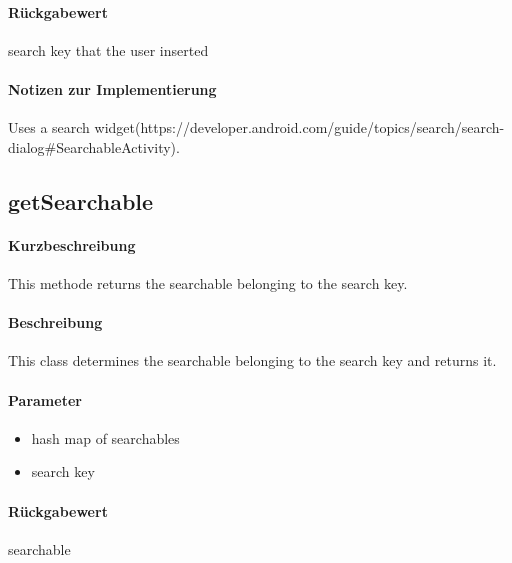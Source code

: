 \paragraph*{Rückgabewert}
search key that the user inserted
\paragraph*{Notizen zur Implementierung}
Uses a search widget(https://developer.android.com/guide/topics/search/search-dialog#SearchableActivity).

\subsection{getSearchable}%
\paragraph*{Kurzbeschreibung}
This methode returns the searchable belonging to the search key.
\paragraph*{Beschreibung}
This class determines the searchable belonging to the search key and returns it.
\paragraph*{Parameter}
\begin{itemize}
    \item hash map of searchables
    \item search key
\end{itemize}
\paragraph*{Rückgabewert}
searchable

